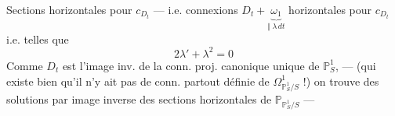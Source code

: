 Sections horizontales  pour $c_{D_t}$ --- i.e. connexions $D_t+\underbrace{\omega_1}_{\Vert\ \lambda\,dt}$ horizontales pour $c_{D_t}$ i.e. telles que
\[
2\lambda'+\lambda^2=0
\]
Comme $D_t$ est l'image inv.  de la conn. proj. canonique unique de $\mathbb P^1_S$, --- (qui existe bien qu'il n'y ait pas de conn. partout définie de $\Omega^1_{\mathbb P^1_S/S}$ !) on trouve des solutions par image inverse des sections  horizontales de $\mathbb P_{\mathbb P^1_S/S}$ ---

